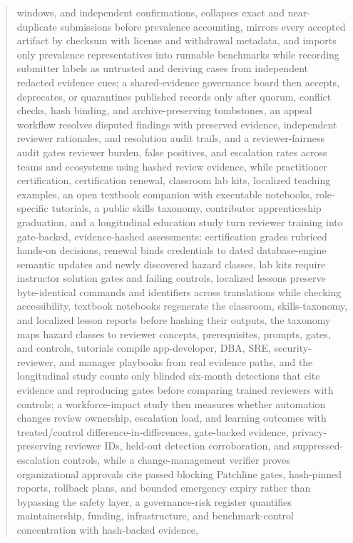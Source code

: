 \documentclass[11pt]{article}
\begin{document}
\begin{abstract}
windows, and independent confirmations, collapses exact and near-duplicate submissions before
prevalence accounting, mirrors every accepted artifact by checksum with license and withdrawal metadata,
and imports only prevalence representatives into runnable benchmarks while recording submitter labels as
untrusted and deriving cases from independent redacted evidence cues;
a shared-evidence governance board then accepts, deprecates, or quarantines published records only after
quorum, conflict checks, hash binding, and archive-preserving tombstones, an appeal workflow resolves
disputed findings with preserved evidence, independent reviewer rationales, and resolution audit trails,
and a reviewer-fairness audit gates reviewer burden, false positives, and escalation rates across teams
and ecosystems using hashed review evidence, while practitioner certification, certification renewal,
classroom lab kits, localized teaching examples, an open textbook companion with executable notebooks, role-specific tutorials, a public skills taxonomy, contributor apprenticeship graduation, and a longitudinal education study turn reviewer training into gate-backed, evidence-hashed
assessments: certification grades rubriced hands-on decisions, renewal binds credentials to dated
database-engine semantic updates and newly discovered hazard classes, lab kits require instructor solution
gates and failing controls, localized lessons preserve byte-identical commands and identifiers across translations while checking accessibility, textbook notebooks regenerate the classroom, skills-taxonomy, and localized lesson reports before hashing their outputs, the taxonomy maps hazard classes to reviewer concepts, prerequisites, prompts, gates, and controls, tutorials compile app-developer, DBA, SRE, security-reviewer, and manager
playbooks from real evidence paths, and the longitudinal study counts only blinded six-month detections that
cite evidence and reproducing gates before comparing trained reviewers with controls; a workforce-impact
study then measures whether automation changes review ownership, escalation load, and learning outcomes
with treated/control difference-in-differences, gate-backed evidence, privacy-preserving reviewer IDs,
held-out detection corroboration, and suppressed-escalation controls, while a
change-management verifier proves organizational
approvals cite passed blocking Patchline gates, hash-pinned reports, rollback plans, and bounded
emergency expiry rather than bypassing the safety layer, a governance-risk register quantifies
maintainership, funding, infrastructure, and benchmark-control concentration with hash-backed evidence,

\end{abstract}
\end{document}
